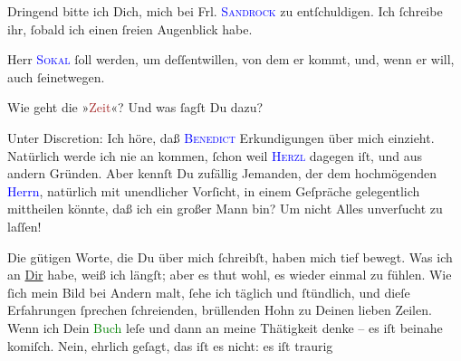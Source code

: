 \pstart
           Dringend bitte ich Dich, mich bei Frl. \textsc{\textcolor{blue}{Sandrock}{}\ledrightnote{\textcolor{blue}{Adele Sandrock}}} zu entſchuldigen. Ich ſchreibe ihr, ſobald ich einen ſreien Augenblick
               habe.\pend
           
\pstart
           Herr \textsc{\textcolor{blue}{Sokal}{}\ledrightnote{\textcolor{blue}{Clemens Sokal}}} ſoll \label{K_L02622-8v}\label{K_L02622-8h} werden, {\pb}um deſſentwillen, von dem er kommt, und, wenn er
               will, auch ſeinetwegen.\pend
           
\pstart
           Wie geht die »\textcolor{brown}{Zeit}{}\ledrightnote{\textcolor{brown}{Die Zeit. Wiener Wochenschrift}}«? Und was ſagſt Du dazu?\pend
           
\pstart
           Unter Discretion: Ich höre, daß \textsc{\textcolor{blue}{Benedict}{}\ledrightnote{\textcolor{blue}{Moriz Benedikt}}} Erkundigungen über mich einzieht. Natürlich werde ich nie an \label{K_L02622-9v}\label{K_L02622-9h} kommen, ſchon weil \textsc{\textcolor{blue}{Herzl}{}\ledrightnote{\textcolor{blue}{Theodor Herzl}}} dagegen iſt, und aus andern Gründen. Aber kennſt Du zufällig Jemanden, der dem
               hochmögenden \textcolor{blue}{Herrn}{}\ledrightnote{\textcolor{blue}{Moriz Benedikt}}, natürlich mit unendlicher
               Vorſicht, in einem Geſpräche gelegentlich mittheilen könnte, {\pb}daß ich ein großer Mann bin? Um nicht Alles
               unverſucht zu laſſen!\pend
           
\pstart
           Die gütigen Worte, die Du über mich ſchreibſt, haben mich tief bewegt. Was ich an \uline{Dir} habe, weiß ich längſt; aber es thut wohl, es
               wieder einmal zu fühlen. Wie ſich mein Bild bei Andern malt, ſehe ich täglich und
               ſtündlich, und dieſe Erfahrungen ſprechen ſchreienden, brüllenden Hohn zu Deinen
               lieben Zeilen. Wenn ich  Dein \textcolor{green}{Buch}{}\ledrightnote{{$\rightarrow$}\textcolor{green}{Sterben. Novelle}} leſe und dann an meine Thätigkeit denke –
                  {\pb}es iſt beinahe komiſch. Nein, ehrlich geſagt,
               das iſt es nicht: es iſt traurig{\dotsfour}\pend
           
